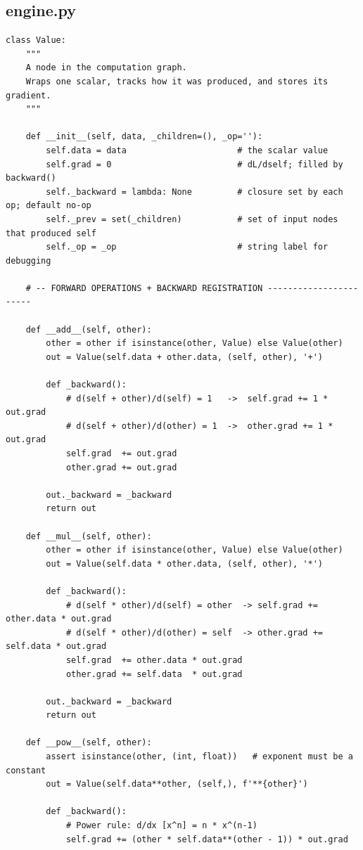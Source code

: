 \documentclass[12pt,a4paper]{article}
\begin{document}
\subsection{engine.py}

\begin{lstlisting}
class Value:
    """
    A node in the computation graph.
    Wraps one scalar, tracks how it was produced, and stores its gradient.
    """

    def __init__(self, data, _children=(), _op=''):
        self.data = data                      # the scalar value
        self.grad = 0                         # dL/dself; filled by backward()
        self._backward = lambda: None         # closure set by each op; default no-op
        self._prev = set(_children)           # set of input nodes that produced self
        self._op = _op                        # string label for debugging

    # -- FORWARD OPERATIONS + BACKWARD REGISTRATION -----------------------

    def __add__(self, other):
        other = other if isinstance(other, Value) else Value(other)
        out = Value(self.data + other.data, (self, other), '+')

        def _backward():
            # d(self + other)/d(self) = 1   ->  self.grad += 1 * out.grad
            # d(self + other)/d(other) = 1  ->  other.grad += 1 * out.grad
            self.grad  += out.grad
            other.grad += out.grad

        out._backward = _backward
        return out

    def __mul__(self, other):
        other = other if isinstance(other, Value) else Value(other)
        out = Value(self.data * other.data, (self, other), '*')

        def _backward():
            # d(self * other)/d(self) = other  -> self.grad += other.data * out.grad
            # d(self * other)/d(other) = self  -> other.grad += self.data * out.grad
            self.grad  += other.data * out.grad
            other.grad += self.data  * out.grad

        out._backward = _backward
        return out

    def __pow__(self, other):
        assert isinstance(other, (int, float))   # exponent must be a constant
        out = Value(self.data**other, (self,), f'**{other}')

        def _backward():
            # Power rule: d/dx [x^n] = n * x^(n-1)
            self.grad += (other * self.data**(other - 1)) * out.grad


\end{lstlisting}
\end{document}
